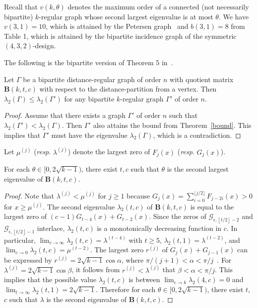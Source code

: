 \documentclass[ALCO,ThmDefs,Unicode,epreuves]{cedram}
\providecommand{\floor}[1]{\left\lfloor#1\right\rfloor}
\begin{document}
\begin{exam} \label{ex:1}
Recall that $v(k, \theta)$ denotes the maximum order of a connected (not necessarily bipartite) $k$-regular graph whose second largest eigenvalue is at most $\theta$. We have $v(3,1)=10$, which is attained by the Petersen graph~\cite{CKNV16} and $b(3,1)=8$ from Table 1, which is attained by the bipartite incidence graph of the symmetric $(4,3,2)$-design. 
\end{exam}

The following is the bipartite version of Theorem 5 in~\cite{N}. 
\begin{coro}
Let $\Gamma$ be a bipartite distance-regular graph of order $n$ with quotient matrix $\boldsymbol{B}(k,t,c)$ with respect to the distance-partition from a vertex. Then $\lambda_2(\Gamma)\leq \lambda_2(\Gamma')$ for any bipartite $k$-regular graph $\Gamma'$ of order $n$. 
\end{coro}
\begin{proof}
Assume that there exists a graph $\Gamma'$ of order $n$ such that $\lambda_2(\Gamma')<\lambda_2(\Gamma)$. Then $\Gamma'$ also attains the bound from Theorem~\ref{bound}. This implies that $\Gamma'$ must have the eigenvalue $\lambda_2(\Gamma)$, which is a contradiction. 
\end{proof}

Let $\mu^{(j)}$ (\emph{resp}. $\lambda^{(j)}$) denote the largest zero of $F_j(x)$ (\emph{resp}. $G_j(x)$). 

\begin{prop}
For each $\theta\in [0,2\sqrt{k-1})$, there exist $t,c$ such that $\theta$ is the second largest eigenvalue of $\boldsymbol{B}(k,t,c)$.
\end{prop}
\begin{proof}

Note that $\lambda^{(j)}<\mu^{(j)}$ for $j\geq 1$ because 
$G_j(x)=\sum_{i=0}^{\lfloor j/2 \rfloor}F_{j-2i}(x) > 0$ for $x \geq \mu^{(j)}$.
The second eigenvalue $\lambda_2(t,c)$ of $\boldsymbol{B}(k,t,c)$ is equal to the largest zero of 
$(c-1)G_{t-4}(x)+G_{t-2}(x)$. 
 Since the zeros of $\mathscr{G}_{\epsilon,\floor{t/2}-2}$ and $\mathscr{G}_{\epsilon, \floor{t/2}-1}$ interlace, $\lambda_2(t,c)$ is a monotonically decreasing function in $c$. In particular, $\lim_{c\rightarrow \infty}\lambda_2(t,c)=\lambda^{(t-4)}$ with $t\geq 5$, $\lambda_2(t,1)=\lambda^{(t-2)}$, and 
$\lim_{c\rightarrow 0} \lambda_2(t,c)=\mu^{(t-2)}$. 
The largest zero $r^{(j)}$ of $G_j(x)+G_{j-1}(x)$ can be expressed by $r^{(j)}=2\sqrt{k-1} \cos \alpha$, where $\pi/(j+1) < \alpha < \pi/j$~\cite[Section~III.3]{BIb}. 
For $\lambda^{(j)}=2\sqrt{k-1} \cos \beta$, 
it follows from $r^{(j)}<\lambda^{(j)}$ that $\beta < \alpha < \pi/j$. This implies that
the possible value $\lambda_2(t,c)$ is between $\lim_{c\rightarrow k}\lambda_2(4,c)=0$ and $\lim_{t\rightarrow \infty} \lambda_2(t,1)=2\sqrt{k-1}$.
Therefore for each $\theta \in \mathopen[0 ,2\sqrt{k-1}\mathclose)$, there exist $t$, $c$ such that $\lambda$ is 
the second eigenvalue of $\boldsymbol{B}(k,t,c)$. 
\end{proof}
\end{document}
